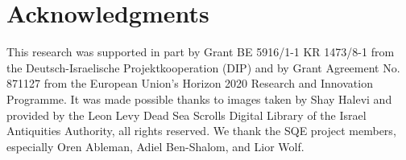 \section*{Acknowledgments}

This research was supported in part by Grant BE 5916/1-1 KR 1473/8-1 from the
Deutsch-Israelische Projektkooperation (DIP) and by Grant Agreement No. 871127
from the European Union’s Horizon 2020 Research and Innovation Programme.  It
was made possible thanks to images taken by Shay Halevi and provided by the
Leon Levy Dead Sea Scrolls Digital Library of the Israel Antiquities Authority,
all rights reserved.  We thank the SQE project members, especially Oren
Ableman, Adiel Ben-Shalom, and Lior Wolf.
